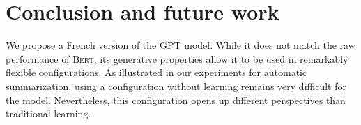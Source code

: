 

\section{Conclusion and future work}

We propose a French version of the GPT model. While it does not match the raw performance of \textsc{Bert}, its generative properties allow it to be used in remarkably flexible configurations. As illustrated in our experiments for automatic summarization, using a configuration without learning remains very difficult for the model. Nevertheless, this configuration opens up different perspectives than traditional learning.

